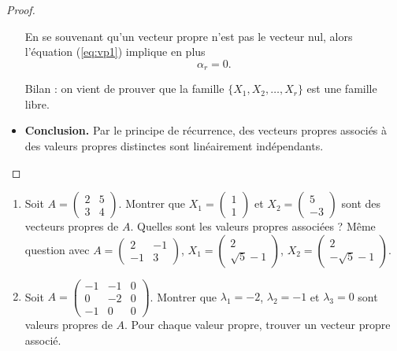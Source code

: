 \documentclass[11pt, class=report,crop=false]{standalone}
\begin{document}
\begin{proof}
\begin{itemize}
En se souvenant qu'un vecteur propre n'est pas le vecteur nul, alors l'équation (\ref{eq:vp1}) implique en plus
$$\alpha_r = 0.$$

Bilan : on vient de prouver que la famille $\{ X_1,X_2,\dots,X_r\}$ est une famille libre.

  \item \textbf{Conclusion.} Par le principe de récurrence, des vecteurs propres associés à des valeurs propres distinctes sont linéairement indépendants.
   
\end{itemize}


\end{proof}


 
 
\begin{miniexercices}
\sauteligne
\begin{enumerate}
  \item Soit $A = \left(\begin{smallmatrix}2 & 5 \\3 & 4 \end{smallmatrix}\right)$.
  Montrer que $X_1 = \left(\begin{smallmatrix}1\\1 \end{smallmatrix}\right)$ et
  $X_2 = \left(\begin{smallmatrix}5\\-3 \end{smallmatrix}\right)$ sont des vecteurs propres de $A$. Quelles sont les valeurs propres associées ?
  Même question avec 
  $A = \left(\begin{smallmatrix} 2 & -1 \\-1 & 3\end{smallmatrix}\right)$, 
  $X_1 = \left(\begin{smallmatrix}2\\ \sqrt{5}-1\end{smallmatrix}\right)$,
  $X_2 = \left(\begin{smallmatrix}2\\ -\sqrt{5}-1\end{smallmatrix}\right)$.
  
  \item Soit $A = \left(\begin{smallmatrix}
  -1 & -1 & 0 \\
0 & -2 & 0 \\
-1 & 0 & 0\end{smallmatrix}\right)$.
Montrer que $\lambda_1 = -2$, $\lambda_2 = -1$ et $\lambda_3 = 0$ sont valeurs propres de $A$.
Pour chaque valeur propre, trouver un vecteur propre associé.
    

\end{enumerate}
\end{miniexercices}
\end{document}
